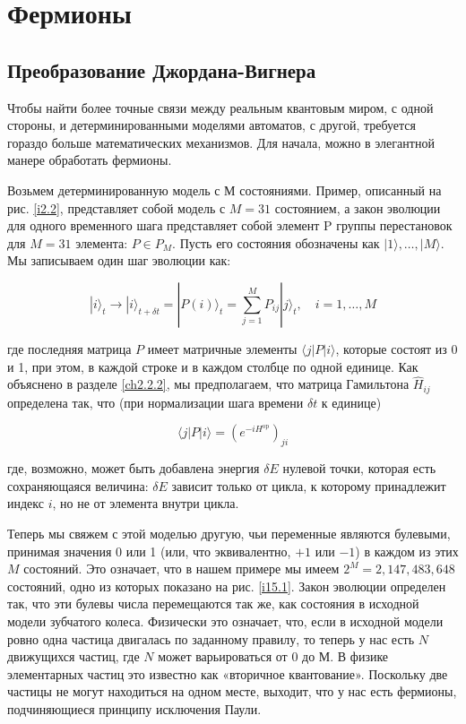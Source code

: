 \documentclass[main.tex]{subfiles}
\begin{document}
\section{Фермионы}\label{ch15}

\subsection{Преобразование Джордана-Вигнера}\label{ch15.1}

Чтобы найти более точные связи между реальным квантовым миром, с одной стороны, и детерминированными моделями автоматов, с другой, требуется гораздо больше математических механизмов. Для начала, можно в элегантной манере обработать фермионы.

Возьмем детерминированную модель с $М$ состояниями. Пример, описанный на рис. \ref{i2.2}, представляет собой модель с $M = 31$ состоянием, а закон эволюции для одного временного шага представляет собой элемент P группы перестановок для $M = 31$ элемента: $P\in P_M$. Пусть его состояния обозначены как $|1\rangle,\ldots,|M\rangle$. Мы записываем один шаг эволюции как:

\begin{equation}\label{15.1}
	|i\rangle_{t} \rightarrow|i\rangle_{t+\delta t}=|P(i)\rangle_{t}=\sum_{j=1}^{M} P_{i j}|j\rangle_{t}, \quad i=1, \ldots, M
\end{equation}

где последняя матрица $P$ имеет матричные элементы $\langle j|P|i \rangle$, которые состоят из 0 и 1, при этом, в каждой строке и в каждом столбце по одной единице. Как объяснено в разделе \ref{ch2.2.2}, мы предполагаем, что матрица Гамильтона $\hat H_{ij}$ определена так, что (при нормализации шага времени $\delta t$ к единице)

\begin{equation}\label{15.2}
	\langle j|P| i\rangle=\left(e^{-i H^{\mathrm{op}}}\right)_{j i}
\end{equation}
         
где, возможно, может быть добавлена энергия $\delta E$ нулевой точки, которая есть сохраняющаяся величина: $\delta E$ зависит только от цикла, к которому принадлежит индекс $i$, но не от элемента внутри цикла.

Теперь мы свяжем с этой моделью другую, чьи переменные являются булевыми, принимая значения 0 или 1 (или, что эквивалентно, $+ 1$ или $-1$) в каждом из этих $M$ состояний. Это означает, что в нашем примере мы имеем $2^M = 2, 147, 483, 648$ состояний, одно из которых показано на рис. \ref{i15.1}. Закон эволюции определен так, что эти булевы числа перемещаются так же, как состояния в исходной модели зубчатого колеса. Физически это означает, что, если в исходной модели ровно одна частица двигалась по заданному правилу, то теперь у нас есть $N$ движущихся частиц, где $N$ может варьироваться от 0 до $М$. В физике элементарных частиц это известно как «вторичное квантование». Поскольку две частицы не могут находиться на одном месте, выходит, что у нас есть фермионы, подчиняющиеся принципу исключения Паули.
\end{document}
